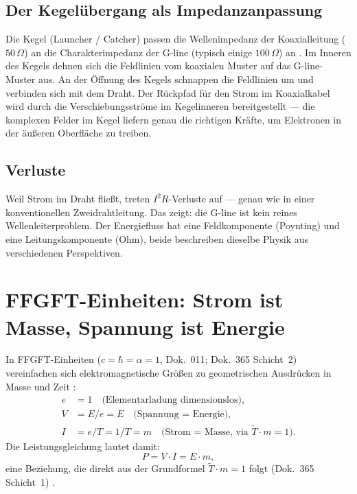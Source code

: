 \subsection*{Der Kegelübergang als Impedanzanpassung}

Die Kegel (Launcher / Catcher) passen die Wellenimpedanz der Koaxialleitung
($50\,\Omega$) an die Charakterimpedanz der G-line (typisch einige
$100\,\Omega$) an \EM. Im Inneren des Kegels dehnen sich die Feldlinien
vom koaxialen Muster auf das G-line-Muster aus. An der Öffnung des Kegels
schnappen die Feldlinien um und verbinden sich mit dem Draht. Der Rückpfad
für den Strom im Koaxialkabel wird durch die Verschiebungsströme im
Kegelinneren bereitgestellt --- die komplexen Felder im Kegel liefern
genau die richtigen Kräfte, um Elektronen in der äußeren Oberfläche zu
treiben.

\subsection*{Verluste}

Weil Strom im Draht fließt, treten $I^2 R$-Verluste auf --- genau wie
in einer konventionellen Zweidrahtleitung. Das zeigt: die G-line ist
kein reines Wellenleiterproblem. Der Energiefluss hat eine
Feldkomponente (Poynting) und eine Leitungskomponente (Ohm), beide
beschreiben dieselbe Physik aus verschiedenen Perspektiven.

\section{FFGFT-Einheiten: Strom ist Masse, Spannung ist Energie}

In FFGFT-Einheiten ($c = \hbar = \alpha = 1$, Dok.~011; Dok.~365 Schicht~2)
vereinfachen sich elektromagnetische Größen zu geometrischen Ausdrücken
in Masse und Zeit \KM:
\begin{align*}
  e &= 1 \quad \text{(Elementarladung dimensionslos)},\\
  V &= E/e = E \quad \text{(Spannung = Energie)},\\
  I &= e/T = 1/T = m \quad \text{(Strom = Masse, via }\tilde{T}\cdot m=1\text{)}.
\end{align*}
Die Leistungsgleichung lautet damit:
\[
  P = V \cdot I = E \cdot m,
\]
eine Beziehung, die direkt aus der Grundformel $\tilde{T}\cdot m=1$ folgt
(Dok.~365 Schicht~1) \KM.

